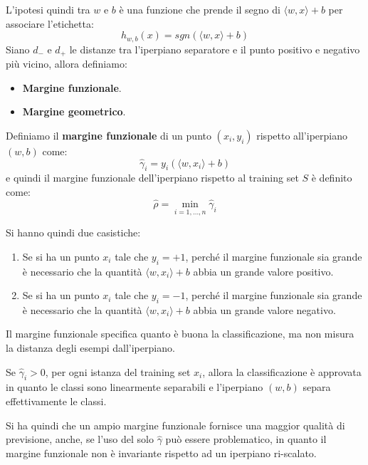 L'ipotesi quindi tra $w$ e $b$ è una funzione che prende il segno di $\langle w,
    x \rangle + b$ per associare l'etichetta:
\begin{equation}
    h_{w,b} (x) = sgn(\langle w, x \rangle + b)
\end{equation}
Siano $d_{-}$ e $d_{+}$ le distanze tra l'iperpiano separatore e il punto positivo
e negativo più vicino, allora definiamo:
\begin{itemize}
    \item \textbf{Margine funzionale}.
    \item \textbf{Margine geometrico}.
\end{itemize}
\begin{definizione}
    Definiamo il \textbf{margine funzionale} di un punto $(x_i, y_i)$ rispetto
    all'iperpiano $(w, b)$ come:
    \begin{equation}
        \hat{\gamma}_i = y_i( \langle w, x_i \rangle + b )
    \end{equation}
    e quindi il margine funzionale dell'iperpiano rispetto al training set $S$ è
    definito come:
    \begin{equation}
        \hat{\rho} = \min_{i = 1, \dots, n} \hat{\gamma}_i
    \end{equation}
\end{definizione}
Si hanno quindi due casistiche:
\begin{enumerate}
    \item Se si ha un punto $x_i$ tale che $y_i = +1$, perché il margine
          funzionale sia grande è necessario che la quantità $\langle w, x_i
              \rangle + b$ abbia un grande valore positivo.
    \item Se si ha un punto $x_i$ tale che $y_i = -1$, perché il margine funzionale
          sia grande è necessario che la quantità $\langle w, x_i \rangle + b$
          abbia un grande valore negativo.
\end{enumerate}
Il margine funzionale specifica quanto è buona la classificazione, ma non misura
la distanza degli esempi dall'iperpiano.
\begin{teorema}
    Se $\hat{\gamma}_i > 0$, per ogni istanza del training set $x_i$, allora la
    classificazione è approvata in quanto le classi sono linearmente separabili
    e l'iperpiano $(w, b)$ separa effettivamente le classi.
\end{teorema}
Si ha quindi che un ampio margine funzionale fornisce una maggior qualità
di previsione, anche, se l'uso del solo $\hat{\gamma}$ può essere problematico,
in quanto il margine funzionale non è invariante rispetto ad un iperpiano ri-scalato.

